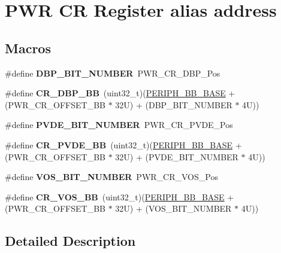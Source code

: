 \hypertarget{group___p_w_r___c_r__register__alias}{}\section{P\+WR CR Register alias address}
\label{group___p_w_r___c_r__register__alias}
\subsection*{Macros}
\begin{DoxyCompactItemize}
\item 
\mbox{\label{group___p_w_r___c_r__register__alias_ga398aef263adbda7c1f1dc9020fde83f3}} 
\#define {\bfseries D\+B\+P\+\_\+\+B\+I\+T\+\_\+\+N\+U\+M\+B\+ER}~P\+W\+R\+\_\+\+C\+R\+\_\+\+D\+B\+P\+\_\+\+Pos
\item 
\mbox{\label{group___p_w_r___c_r__register__alias_ga799ab60bdbcfc1076cf2d7f206d09b0c}} 
\#define {\bfseries C\+R\+\_\+\+D\+B\+P\+\_\+\+BB}~(uint32\+\_\+t)(\hyperlink{group___peripheral__memory__map_gaed7efc100877000845c236ccdc9e144a}{P\+E\+R\+I\+P\+H\+\_\+\+B\+B\+\_\+\+B\+A\+SE} + (P\+W\+R\+\_\+\+C\+R\+\_\+\+O\+F\+F\+S\+E\+T\+\_\+\+BB $\ast$ 32\+U) + (\+D\+B\+P\+\_\+\+B\+I\+T\+\_\+\+N\+U\+M\+B\+E\+R $\ast$ 4\+U))
\item 
\mbox{\label{group___p_w_r___c_r__register__alias_gae731170c1675c5471fc06501228905b0}} 
\#define {\bfseries P\+V\+D\+E\+\_\+\+B\+I\+T\+\_\+\+N\+U\+M\+B\+ER}~P\+W\+R\+\_\+\+C\+R\+\_\+\+P\+V\+D\+E\+\_\+\+Pos
\item 
\mbox{\label{group___p_w_r___c_r__register__alias_ga49f51ef8285a6be76fd204d49a00709c}} 
\#define {\bfseries C\+R\+\_\+\+P\+V\+D\+E\+\_\+\+BB}~(uint32\+\_\+t)(\hyperlink{group___peripheral__memory__map_gaed7efc100877000845c236ccdc9e144a}{P\+E\+R\+I\+P\+H\+\_\+\+B\+B\+\_\+\+B\+A\+SE} + (P\+W\+R\+\_\+\+C\+R\+\_\+\+O\+F\+F\+S\+E\+T\+\_\+\+BB $\ast$ 32\+U) + (\+P\+V\+D\+E\+\_\+\+B\+I\+T\+\_\+\+N\+U\+M\+B\+E\+R $\ast$ 4\+U))
\item 
\mbox{\label{group___p_w_r___c_r__register__alias_ga9fe65342711a2c4614ef2eadee4a751c}} 
\#define {\bfseries V\+O\+S\+\_\+\+B\+I\+T\+\_\+\+N\+U\+M\+B\+ER}~P\+W\+R\+\_\+\+C\+R\+\_\+\+V\+O\+S\+\_\+\+Pos
\item 
\mbox{\label{group___p_w_r___c_r__register__alias_ga98bf66513495732b9b3ee21f182e1591}} 
\#define {\bfseries C\+R\+\_\+\+V\+O\+S\+\_\+\+BB}~(uint32\+\_\+t)(\hyperlink{group___peripheral__memory__map_gaed7efc100877000845c236ccdc9e144a}{P\+E\+R\+I\+P\+H\+\_\+\+B\+B\+\_\+\+B\+A\+SE} + (P\+W\+R\+\_\+\+C\+R\+\_\+\+O\+F\+F\+S\+E\+T\+\_\+\+BB $\ast$ 32\+U) + (\+V\+O\+S\+\_\+\+B\+I\+T\+\_\+\+N\+U\+M\+B\+E\+R $\ast$ 4\+U))
\end{DoxyCompactItemize}


\subsection{Detailed Description}
